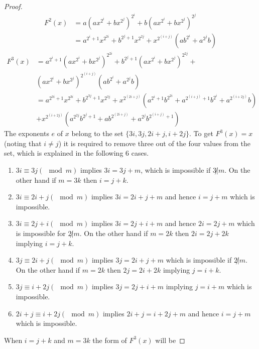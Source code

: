 \documentclass[10pt,a4paper]{amsart}
\begin{document}
\begin{proof}
	\begin{equation}
		\begin{split}
			F^{2}(x)&=a(ax^{2^{i}}+bx^{2^{j}})^{2^{i}}+b(ax^{2^{i}}+bx^{2^{j}})^{2^{j}}\\
			&=a^{2^{i}+1}x^{2^{2i}}+b^{2^{j}+1}x^{2^{2j}}+x^{2^{(i+j)}}(ab^{2^{i}}+a^{2^{j}}b)
		\end{split}
	\end{equation}
	\begin{equation}
		\begin{split}
			F^{3}(x)&=a^{2^{i}+1}(ax^{2^{i}}+bx^{2^{j}})^{2^{2i}}+b^{2^{j}+1}(ax^{2^{i}}+bx^{2^{j}})^{2^{2j}}+\\
   &(ax^{2^{i}}+bx^{2^{j}})^{2^{(i+j)}}(ab^{2^{i}}+a^{2^{j}}b)\\
			&=a^{2^{3i}+1}x^{2^{3i}}+b^{2^{3j}+1}x^{2^{3j}}+x^{2^{(2i+j)}}(a^{2^{i}+1}b^{2^{2i}}+a^{2^{(i+j)}+1}b^{2^{i}}+a^{2^{(i+2j)}}b)\\
			&+x^{2^{(i+2j)}}(a^{2^{2j}}b^{2^{j}+1}+ab^{2^{(2i+j)}}+a^{2^{j}}b^{2^{(i+j)}+1})	
		\end{split}	
	\end{equation}
	The exponents $ e $ of $ x $  belong to the set $\{3i,3j,2i+j,i+2j\}$. To get $ F^{3}(x)=x $ (noting that $ i\not=j $) it is required to remove three out of the four values from the set, which is explained in the following 6 cases.
	\begin{enumerate}
		\item  $ 3i\equiv3j(\mod m) $ implies $ 3i=3j+m $, which is impossible if $ 3\not|m $. On the other hand if $  m=3k $ then $ i=j+k $.
		\item $ 3i\equiv2i+j(\mod m) $ implies $ 3i=2i+j+m $ and hence $ i=j+m $ which is impossible. 
		\item $ 3i\equiv2j+i(\mod m) $ implies $ 3i=2j+i+m $ and hence $ 2i=2j+m $ which is impossible for $2\not|m$. On the other hand if $ m=2k $ then $ 2i=2j+2k $ implying  $ i=j+k $.
		\item $ 3j\equiv2i+j(\mod m) $ implies $ 3j=2i+j+m $ which is impossible if $2\not|m$. On the other hand if $ m=2k $ then $ 2j=2i+2k $ implying $ j=i+k $.
		\item $ 3j\equiv i+2j(\mod m) $ implies  $ 3j=2j+i+m $ implying $ j=i+m $ which is impossible.
		\item $ 2i+j\equiv i+2j(\mod m) $ implies $ 2i+j=i+2j+m $ and hence $ i=j+m $ which is impossible.
	\end{enumerate}
	When $ i=j+k $ and $ m=3k $ the form of  $ F^{3}(x) $ will be

\end{proof}
\end{document}
